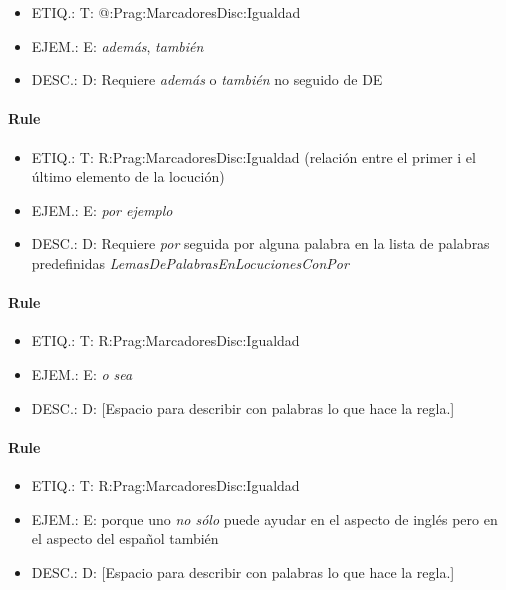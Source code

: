 \documentclass[11pt]{report}
\begin{document}
\begin{itemize}
\item ETIQ.:  T: @:Prag:MarcadoresDisc:Igualdad
\item EJEM.:  E: \emph{además}, \emph{también}
\item DESC.:  D: Requiere \emph{además} o \emph{también} no seguido de DE
\end{itemize}

\paragraph*{Rule}
\begin{itemize}
\item ETIQ.:  T: R:Prag:MarcadoresDisc:Igualdad (relación entre el primer i el último elemento de la locución)
\item EJEM.:  E: \emph{por ejemplo}
\item DESC.:  D: Requiere \emph{por} seguida por alguna palabra en la lista de palabras predefinidas \emph{LemasDePalabrasEnLocucionesConPor}
\end{itemize}

\paragraph*{Rule}
\begin{itemize}
\item ETIQ.:  T: R:Prag:MarcadoresDisc:Igualdad
\item EJEM.:  E: \emph{o sea}
\item DESC.:  D: [Espacio para describir con palabras lo que hace la regla.]
\end{itemize}

\paragraph*{Rule}
\begin{itemize}
\item ETIQ.:  T: R:Prag:MarcadoresDisc:Igualdad
\item EJEM.:  E: porque uno \emph{no sólo} puede ayudar en el aspecto de inglés pero en el aspecto del español también
\item DESC.:  D: [Espacio para describir con palabras lo que hace la regla.]
\end{itemize}
\end{document}
